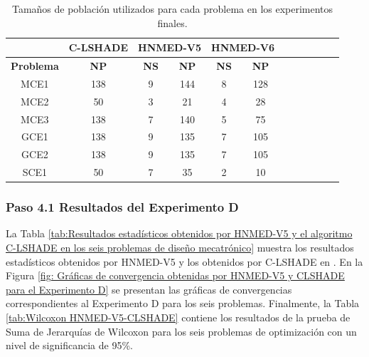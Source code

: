 \begin{table}[]
	\centering
	\caption{Tamaños de población utilizados para cada problema en los experimentos finales.}
	\label{tab:Tamaños de población utilizados para cada problema en los experimentos finales}
	
	\begin{tabular}{cccccccccccc}
		& \textbf{C-LSHADE } & \multicolumn{2}{l}{\textbf{HNMED-V5}}&\multicolumn{2}{l}{\textbf{HNMED-V6}}\\
		\hline
		\textbf{Problema} & \textbf{NP}    & \textbf{NS} & \textbf{NP}& \textbf{NS}& \textbf{NP}\\
		\hline
		MCE1     & 138           & 9           & 144 &8&128   \\
		MCE2     & 50            & 3           & 21  &4&28       \\
		MCE3     & 138           & 7           & 140 &5&75      \\
		GCE1     & 138           & 9           & 135 &7&105        \\
		GCE2     & 138           & 9           & 135 &7&105    \\
		SCE1     & 50            & 7           & 35  &2&10       
	\end{tabular}
	
\end{table}


\subsubsection{Paso 4.1 Resultados del Experimento D}
La Tabla \ref{tab:Resultados estadísticos obtenidos por HNMED-V5 y el algoritmo C-LSHADE en los seis problemas de diseño mecatrónico} muestra los resultados estadísticos obtenidos por HNMED-V5 y los obtenidos por C-LSHADE en \cite{zapata_zapata_control_2017}. En la Figura \ref{fig: Gráficas de convergencia obtenidas por HNMED-V5 y CLSHADE para el Experimento D} se presentan las gráficas de convergencias correspondientes al Experimento D para los seis problemas. Finalmente, la Tabla \ref{tab:Wilcoxon HNMED-V5-CLSHADE} contiene los resultados de la prueba de Suma de Jerarquías de Wilcoxon para los seis problemas de optimización con un nivel de significancia de 95\%.

